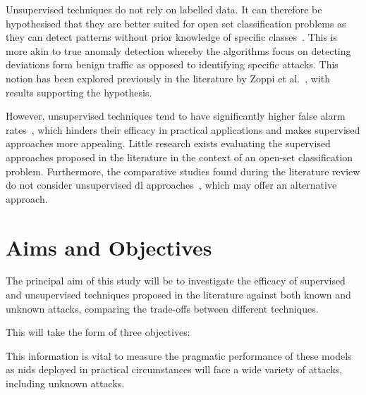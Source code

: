 Unsupervised techniques do not rely on labelled data. It can therefore be
hypothesised that they are better suited for open set classification problems
as they can detect patterns without prior knowledge of specific
classes~\cite{unsupervised_ml}. This is more akin to true anomaly detection
whereby the algorithms focus on detecting deviations form benign traffic as
opposed to identifying specific attacks. This notion has been explored
previously in the literature by Zoppi et al.~\cite{Zoppi}, with results
supporting the hypothesis.

However, unsupervised techniques tend to have significantly higher false alarm
rates~\cite{Zoppi}, which hinders their efficacy in practical applications and
makes supervised approaches more appealing. Little research exists evaluating
the supervised approaches proposed in the literature in the context of an
open-set classification problem. Furthermore, the comparative studies found
during the literature review do not consider unsupervised \gls{dl}
approaches~\cite{Kus, Zoppi}, which may offer an alternative approach.

\section{Aims and Objectives}%
\label{sec:aims}

The principal aim of this study will be to investigate the efficacy of
supervised and unsupervised techniques proposed in the literature against both
known and unknown attacks, comparing the trade-offs between different
techniques.

This will take the form of three objectives:

\hypertarget{obj}{}

\begin{center}
\end{center}

This information is vital to measure the pragmatic performance of these models
as \gls{nids} deployed in practical circumstances will face a wide variety of
attacks, including unknown attacks.


